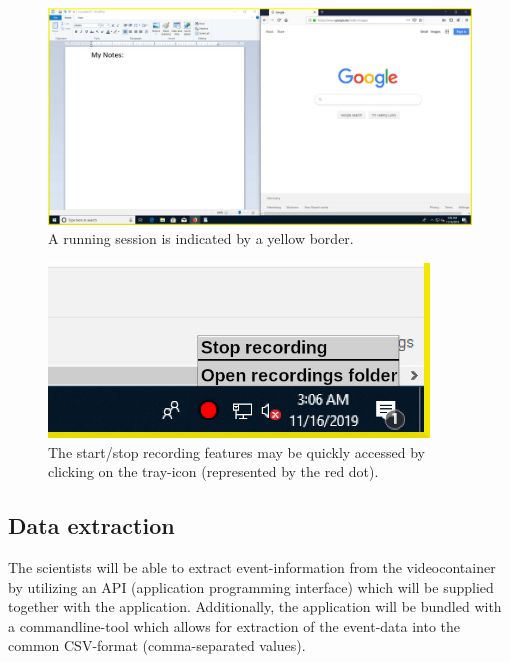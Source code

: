 \begin{figure}[h!]
  \includegraphics[width=1.00\textwidth]{resources/ui_recordindicator.jpg}
  \centering
  \caption{A running \gls{session} is indicated by a yellow border.}
  \label{fig:ui_recordindicator}
\end{figure}
\begin{figure}[h!]
  \includegraphics[width=0.90\textwidth]{resources/ui_trayicon.jpg}
  \centering
  \caption{The start/stop recording features may be quickly accessed by clicking on the tray-icon (represented by the red dot).}
  \label{fig:ui_trayicon}
\end{figure}

\subsection{Data extraction}
The \glspl{scientist} will be able to extract \gls{event}-information from the videocontainer by utilizing an API (application programming interface) which will be supplied together with the application. Additionally, the application will be bundled with a commandline-tool which allows for extraction of the \gls{event}-data into the common CSV-format (comma-separated values).